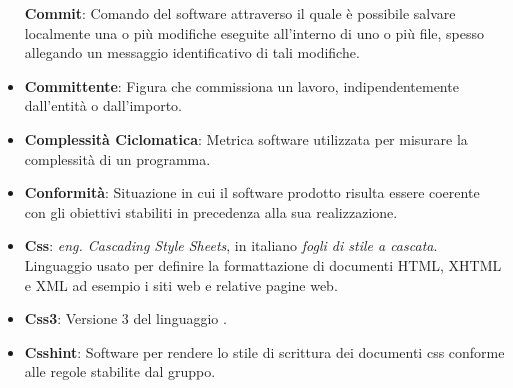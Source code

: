 \begin{itemize}
	\textbf{Commit}: Comando del software  attraverso il quale è possibile salvare localmente una o più modifiche eseguite all'interno di uno o più file, spesso allegando un messaggio identificativo di tali modifiche.
	\item
	\textbf{Committente}: Figura che commissiona un lavoro, indipendentemente dall'entità o dall'importo.
	\item
	\textbf{Complessità Ciclomatica}: Metrica software utilizzata per misurare la complessità di un programma.
	\item
	\textbf{Conformità}: Situazione in cui il software prodotto risulta essere coerente con gli obiettivi stabiliti in precedenza alla sua realizzazione.
	\item
	\textbf{Css}: \textit{eng. Cascading Style Sheets}, in italiano \textit{fogli di stile a cascata}. Linguaggio usato per definire la formattazione di documenti HTML, XHTML e XML ad esempio i siti web e relative pagine web.
	\item
	\textbf{Css3}: Versione 3 del linguaggio .
	\item
	\textbf{Csshint}: Software per rendere lo stile di scrittura dei documenti css conforme alle regole stabilite dal gruppo.
\end{itemize}
\newpage